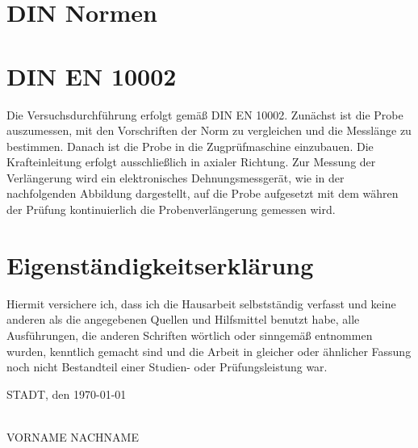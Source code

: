 \newpage
\printbibliography

\newpage


\newpage
\section*{DIN Normen}

\section*{DIN EN 10002}\label{marker}
Die Versuchsdurchführung erfolgt gemäß DIN EN 10002. Zunächst ist die Probe auszumessen, mit den Vorschriften der Norm zu vergleichen und die Messlänge zu bestimmen.
Danach ist die Probe in die Zugprüfmaschine einzubauen. Die Krafteinleitung erfolgt ausschließlich in axialer Richtung. Zur Messung der Verlängerung wird ein elektronisches
Dehnungsmessgerät, wie in der nachfolgenden Abbildung dargestellt, auf die Probe aufgesetzt mit dem währen der Prüfung kontinuierlich die Probenverlängerung gemessen
wird.


\newpage
\section*{Eigenständigkeitserklärung}
Hiermit versichere ich, dass ich die Hausarbeit selbstständig verfasst und keine anderen als die angegebenen Quellen und Hilfsmittel benutzt habe, alle Ausführungen, die anderen Schriften wörtlich oder sinngemäß entnommen wurden, kenntlich gemacht sind und die Arbeit in gleicher oder ähnlicher Fassung noch nicht Bestandteil einer Studien- oder Prüfungsleistung war.

\vspace{100mm}
\noindent{}STADT, den \today
\begin{minipage}[t]{8cm}
\centering \hspace{20mm} \hrulefill \\
\hspace{20mm}VORNAME NACHNAME
\end{minipage}